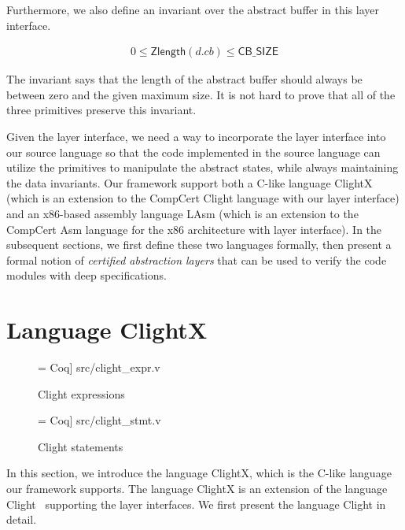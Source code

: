 Furthermore, we also define an invariant over the abstract buffer
in this layer interface.

\begin{invariant}
\begin{align*}
0 \leq \textsf{Zlength} (d.cb) \leq \textsf{CB\_SIZE}
\end{align*}
\end{invariant}

The invariant says that the length of the abstract buffer should always
be between zero and the given maximum size.
It is not hard to prove that all of the three primitives preserve
this invariant.

Given the layer interface, we need a way to incorporate the layer interface
into our source language so that the code implemented in the source language
can utilize the primitives to manipulate the abstract states, while always
maintaining the data invariants. Our framework support both a C-like
language ClightX (which is an extension to the CompCert Clight language
with our layer interface) and an x86-based assembly language LAsm
(which is an extension to the CompCert Asm language for the x86
architecture with layer interface). In the subsequent sections,
we first define these two languages formally, then present
a formal notion of {\em certified abstraction layers} that can be used
to verify the code modules with deep specifications.



\section{Language ClightX}

\begin{figure}
 = Coq] {src/clight_expr.v}
\caption{Clight expressions}
\label{fig:clight_expr}
\end{figure}

\begin{figure}
 = Coq] {src/clight_stmt.v}
\caption{Clight statements}
\label{fig:clight_stmt}
\end{figure}

In this section, we introduce the language ClightX, which is the C-like
language our framework supports. 
The language ClightX is an extension of the language Clight~\cite{blazy-leroy-clight}
supporting the layer interfaces. We first present the language Clight in detail.

